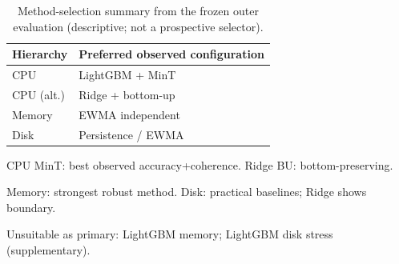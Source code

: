 \begin{table}[width=\columnwidth,pos=t]
\centering
\caption{Method-selection summary from the frozen outer evaluation (descriptive; not a prospective selector).}
\label{tab:method_selection}
\begin{threeparttable}
\small
\begin{tabularx}{\tblwidth}{@{}l>{\raggedright\arraybackslash}X@{}}
\toprule
Hierarchy & Preferred observed configuration \\
\midrule
CPU & LightGBM + MinT \\
CPU (alt.) & Ridge + bottom-up \\
Memory & EWMA independent \\
Disk & Persistence / EWMA \\
\bottomrule
\end{tabularx}
\begin{tablenotes}
\footnotesize
\item CPU MinT: best observed accuracy+coherence. Ridge BU: bottom-preserving.
\item Memory: strongest robust method. Disk: practical baselines; Ridge shows boundary.
\item Unsuitable as primary: LightGBM memory; LightGBM disk stress (supplementary).
\end{tablenotes}
\end{threeparttable}
\end{table}

